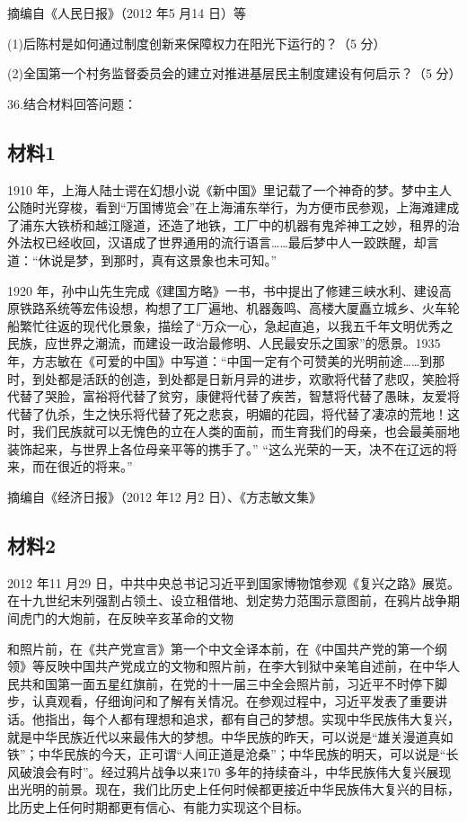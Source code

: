 \documentclass[UTF8,11pt]{ctexart}
\begin{document}
摘编自《人民日报》（2012 年5 月14 日）等

(1)后陈村是如何通过制度创新来保障权力在阳光下运行的？（5 分）


(2)全国第一个村务监督委员会的建立对推进基层民主制度建设有何启示？（5 分）


36.结合材料回答问题：


\subsection*{材料1}

1910 年，上海人陆士谔在幻想小说《新中国》里记载了一个神奇的梦。梦中主人公随时光穿梭，看到“万国博览会”在上海浦东举行，为方便市民参观，上海滩建成了浦东大铁桥和越江隧道，还造了地铁，工厂中的机器有鬼斧神工之妙，租界的治外法权已经收回，汉语成了世界通用的流行语言……最后梦中人一跤跌醒，却言道：“休说是梦，到那时，真有这景象也未可知。”

1920 年，孙中山先生完成《建国方略》一书，书中提出了修建三峡水利、建设高原铁路系统等宏伟设想，构想了工厂遍地、机器轰鸣、高楼大厦矗立城乡、火车轮船繁忙往返的现代化景象，描绘了“万众一心，急起直追，以我五千年文明优秀之民族，应世界之潮流，而建设一政治最修明、人民最安乐之国家”的愿景。1935 年，方志敏在《可爱的中国》中写道：“中国一定有个可赞美的光明前途……到那时，到处都是活跃的创造，到处都是日新月异的进步，欢歌将代替了悲叹，笑脸将代替了哭脸，富裕将代替了贫穷，康健将代替了疾苦，智慧将代替了愚昧，友爱将代替了仇杀，生之快乐将代替了死之悲哀，明媚的花园，将代替了凄凉的荒地！这时，我们民族就可以无愧色的立在人类的面前，而生育我们的母亲，也会最美丽地装饰起来，与世界上各位母亲平等的携手了。” “这么光荣的一天，决不在辽远的将来，而在很近的将来。”

摘编自《经济日报》（2012 年12 月2 日）、《方志敏文集》

\subsection*{材料2}

2012 年11 月29 日，中共中央总书记习近平到国家博物馆参观《复兴之路》展览。在十九世纪末列强割占领土、设立租借地、划定势力范围示意图前，在鸦片战争期间虎门的大炮前，在反映辛亥革命的文物


和照片前，在《共产党宣言》第一个中文全译本前，在《中国共产党的第一个纲领》等反映中国共产党成立的文物和照片前，在李大钊狱中亲笔自述前，在中华人民共和国第一面五星红旗前，在党的十一届三中全会照片前，习近平不时停下脚步，认真观看，仔细询问和了解有关情况。在参观过程中，习近平发表了重要讲话。他指出，每个人都有理想和追求，都有自己的梦想。实现中华民族伟大复兴，就是中华民族近代以来最伟大的梦想。中华民族的昨天，可以说是“雄关漫道真如铁”；中华民族的今天，正可谓“人间正道是沧桑”；中华民族的明天，可以说是“长风破浪会有时”。经过鸦片战争以来170 多年的持续奋斗，中华民族伟大复兴展现出光明的前景。现在，我们比历史上任何时候都更接近中华民族伟大复兴的目标，比历史上任何时期都更有信心、有能力实现这个目标。
\end{document}
